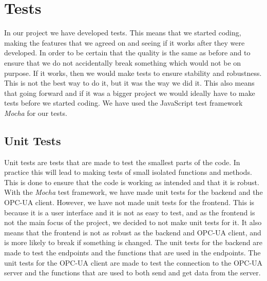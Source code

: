 \section{Tests}

In our project we have developed tests.
This means that we started coding, making the features that we agreed on
and seeing if it works after they were developed.
In order to be certain that the quality is the same as before
and to ensure that we do not accidentally break something which would not be on purpose.
If it works, then we would make tests to ensure stability and robustness.
This is not the best way to do it, but it was the way we did it.
This also means that going forward and if it was a bigger project
we would ideally have to make tests before we started coding.
We have used the JavaScript test framework \textit{Mocha} for our tests.

\subsection{Unit Tests}

Unit tests are tests that are made to test the smallest parts of the code.
In practice this will lead to making tests of small isolated functions and methods.
This is done to ensure that the code is working as intended and that it is robust.
With the \textit{Mocha} test framework, we have made unit tests for the backend and the OPC-UA client.
However, we have not made unit tests for the frontend.
This is because it is a user interface and it is not as easy to test, and as the frontend is not the main focus of the project, we decided to not make unit tests for it.
It also means that the frontend is not as robust as the backend and OPC-UA client, and is more likely to break if something is changed.
The unit tests for the backend are made to test the endpoints and the functions that are used in the endpoints.
The unit tests for the OPC-UA client are made to test the connection to the OPC-UA server and the functions that are used to both send and get data from the server. \newline


